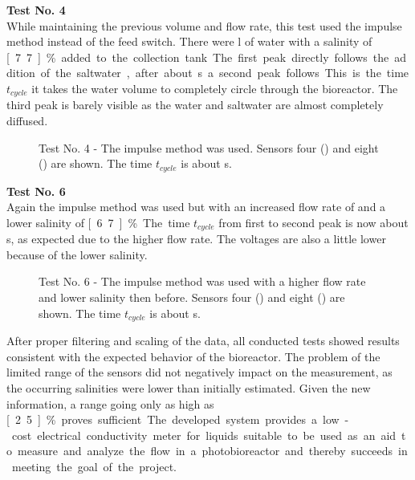 \textbf{Test No. 4}\\

While maintaining the previous volume and flow rate, this test used the impulse method instead of the feed switch. There were \unit[5]{l} of water with a salinity of \unit[7.7]{\%} added to the collection tank. The first peak directly follows the addition of the saltwater, after about \unit[49]{s} a second peak follows. This is the time $t_{cycle}$ it takes the water volume to completely circle through the bioreactor. The third peak is barely visible as the water and saltwater are almost completely diffused.\\

\begin{figure}[H]
	\begin{center}
		
		\caption[Test No. 4]{Test No. 4 - The impulse method was used. Sensors four (\drawline[cyan]) and eight (\drawline[red]) are shown. The time $t_{cycle}$ is about \unit[49]{s}.}
		\label{fig:test4}
	\end{center}
\end{figure}

\textbf{Test No. 6}\\

Again the impulse method was used but with an increased flow rate of  and a lower salinity of \unit[6.7]{\%}. The time $t_{cycle}$ from first to second peak is now about \unit[41]{s}, as expected due to the higher flow rate. The voltages are also a little lower because of the lower salinity.\\

\begin{figure}
	\begin{center}
		
		\caption[Test No. 6]{Test No. 6 - The impulse method was used with a higher flow rate and lower salinity then before. Sensors four (\drawline[cyan]) and eight (\drawline[red]) are shown. The time $t_{cycle}$ is about \unit[41]{s}.}
		\label{fig:test6}
	\end{center}
\end{figure}

After proper filtering and scaling of the data, all conducted tests showed results consistent with the expected behavior of the bioreactor. The problem of the limited range of the sensors did not negatively impact on the measurement, as the occurring salinities were lower than initially estimated. Given the new information, a range going only as high as \unit[2.5]{\%} proves sufficient. The developed system provides a low-cost electrical conductivity meter for liquids suitable to be used as an aid to measure and analyze the flow in a photobioreactor and thereby succeeds in meeting the goal of the project.